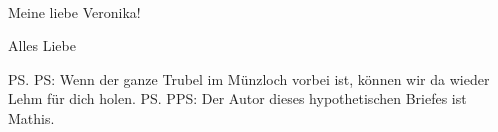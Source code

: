 \documentclass[12pt,ngerman,personal_settings,address_Hermann]{scrlttr2}
\renewcommand{\AuName}{Mathis}
\begin{document}
\begin{letter}{\EmName\\ \EmAddress}
\opening{Meine liebe Veronika!}



\closing{Alles Liebe}
\ps{PS: Wenn der ganze Trubel im Münzloch vorbei ist, können wir da wieder Lehm für dich holen.}
\ps{PPS: Der Autor dieses hypothetischen Briefes ist \AuName.}

\newpage
\printURLlong
\printlicense
\end{letter}
\end{document}
